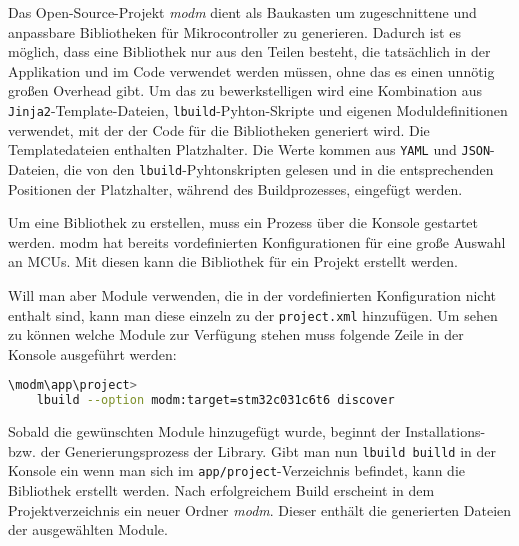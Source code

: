 Das Open-Source-Projekt \emph{modm} dient als Baukasten um zugeschnittene und anpassbare Bibliotheken für Mikrocontroller zu generieren.
Dadurch ist es möglich, dass eine Bibliothek nur aus den Teilen besteht, die tatsächlich in der Applikation und im Code verwendet werden müssen, ohne das es einen unnötig großen Overhead gibt.
Um das zu bewerkstelligen wird eine Kombination aus \texttt{Jinja2}-Template-Dateien, \texttt{lbuild}-Pyhton-Skripte und eigenen Moduldefinitionen verwendet, mit der der Code für die Bibliotheken generiert wird.
Die Templatedateien enthalten Platzhalter.
Die Werte kommen aus \texttt{YAML} und \texttt{JSON}-Dateien, die von den \texttt{lbuild}-Pyhtonskripten gelesen und in die entsprechenden Positionen der Platzhalter, während des Buildprozesses, eingefügt werden.
 
Um eine Bibliothek zu erstellen, muss ein Prozess über die Konsole gestartet werden.
modm hat bereits vordefinierten Konfigurationen für eine große Auswahl an MCUs.
Mit diesen kann die Bibliothek für ein Projekt erstellt werden.

Will man aber Module verwenden, die in der vordefinierten Konfiguration nicht enthalt sind, kann man diese einzeln zu der \texttt{project.xml} hinzufügen.
Um sehen zu können welche Module zur Verfügung stehen muss folgende Zeile in der Konsole ausgeführt werden:

\vspace{3mm}
\begin{lstlisting}[language=bash, caption={Konsolenbefehl um verf\"ugbare Module aufgelistet zu bekommen; hier f\"ur den STM32C031C6T6 Mikrokontroller.}, label={lst:modm_lbild_discover}]
\modm\app\project>
	lbuild --option modm:target=stm32c031c6t6 discover
\end{lstlisting}

Sobald die gewünschten Module hinzugefügt wurde, beginnt der Installations- bzw. der Generierungsprozess der Library. 
Gibt man nun \texttt{lbuild builld} in der Konsole ein wenn man sich im \texttt{app/project}-Verzeichnis befindet, kann die Bibliothek erstellt werden.
Nach erfolgreichem Build erscheint in dem Projektverzeichnis ein neuer Ordner \emph{modm}.
Dieser enthält die generierten Dateien der ausgewählten Module.

%

